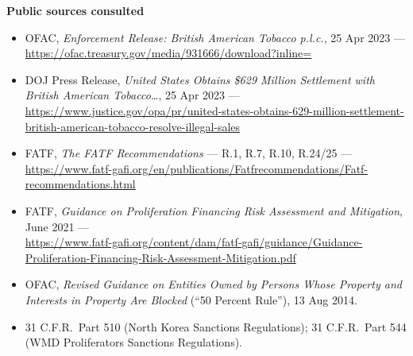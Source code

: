 \documentclass[10.5pt]{article}
\begin{document}
\vspace{4pt}
{\footnotesize\sloppy
\textbf{Public sources consulted}
\begin{itemize}
\item OFAC, \textit{Enforcement Release: British American Tobacco p.l.c.}, 25 Apr 2023 --- \\ \url{https://ofac.treasury.gov/media/931666/download?inline=}
\item DOJ Press Release, \textit{United States Obtains \$629 Million Settlement with British American Tobacco\ldots}, 25 Apr 2023 --- \\ \url{https://www.justice.gov/opa/pr/united-states-obtains-629-million-settlement-british-american-tobacco-resolve-illegal-sales}
\item FATF, \textit{The FATF Recommendations} --- R.1, R.7, R.10, R.24/25 --- \\ \url{https://www.fatf-gafi.org/en/publications/Fatfrecommendations/Fatf-recommendations.html}
\item FATF, \textit{Guidance on Proliferation Financing Risk Assessment and Mitigation}, June 2021 --- \\ \url{https://www.fatf-gafi.org/content/dam/fatf-gafi/guidance/Guidance-Proliferation-Financing-Risk-Assessment-Mitigation.pdf}
\item OFAC, \textit{Revised Guidance on Entities Owned by Persons Whose Property and Interests in Property Are Blocked} (``50 Percent Rule''), 13 Aug 2014.
\item 31 C.F.R.\ Part 510 (North Korea Sanctions Regulations); 31 C.F.R.\ Part 544 (WMD Proliferators Sanctions Regulations).
\end{itemize}
}
\end{document}
